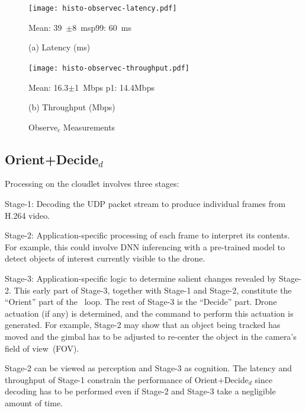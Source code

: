 \begin{figure}
\vspace{0.1in}
\centering
\begin{minipage}[b]{.49\linewidth}
\centering
\texttt{[image: histo-observec-latency.pdf]}\\
\begin{captext}
\centering
Mean: 39~$\pm$8~ms\;p99: 60~ms\\
\end{captext}
\vspace{-0.05in}
{\small (a) Latency (ms)}
\end{minipage}
\begin{minipage}[b]{0.49\linewidth}
\centering
\texttt{[image: histo-observec-throughput.pdf]}\\
\begin{captext}
\centering
Mean: 16.3$\pm$1~Mbps p1: 14.4Mbps
\end{captext}
{\small (b) Throughput (Mbps)}
\end{minipage}
\vspace{-0.1in}
\caption{\small Observe$_c$ Measurements}
\label{fig:d2c-net}
\end{figure}

\subsection{Orient+Decide$_d$}
\label{sec:cloudlet}

Processing on the cloudlet involves three stages:
\begin{smitemize}

\item{Stage-1: Decoding the UDP packet stream to produce individual
    frames from H.264 video.}

\item{Stage-2: Application-specific processing of each frame to
    interpret its contents.  For example, this could involve DNN
    inferencing with a pre-trained model to detect objects of
    interest currently visible to the drone.}

\item{Stage-3: Application-specific logic to determine salient changes
    revealed by Stage-2.  This early part of Stage-3, together with
    Stage-1 and Stage-2, constitute the ``Orient'' part of the
    \ooda~loop.  The rest of Stage-3 is the ``Decide'' part. Drone
    actuation (if any) is determined, and the command to perform this
    actuation is generated.  For example, Stage-2 may show that an
    object being tracked has moved and the gimbal has to be adjusted
    to re-center the object in the camera's field of view~(FOV).}
\end{smitemize}
Stage-2 can be viewed as perception and Stage-3 as cognition.  The
latency and throughput of Stage-1 constrain the performance of
Orient+Decide$_d$ since decoding has to be performed even if Stage-2
and Stage-3 take a negligible amount of time.


